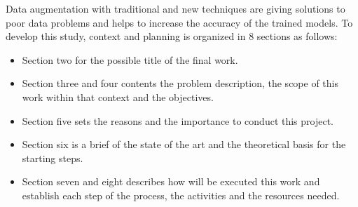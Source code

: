 Data augmentation with traditional and new techniques are giving solutions to poor data problems and helps to increase the accuracy of the trained models\cite{barbedo2018impact}. To develop this study, context and planning is organized in 8 sections as follows:
\begin{itemize}
\item Section two for the possible title of the final work.
\item Section three and four contents the problem description, the scope of this work within that context and the objectives. 
\item Section five sets the reasons and the importance to conduct this project.
\item Section six is a brief of the state of the art and the theoretical basis for the starting steps.
\item Section seven and eight describes how will be executed this work and establish each step of the process, the activities and the resources needed.
\end{itemize}